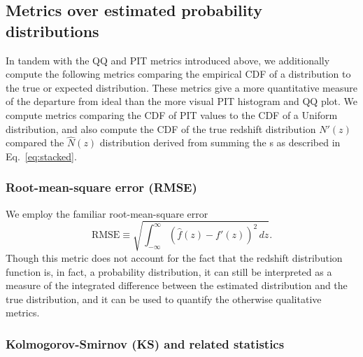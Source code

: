 
\subsection{Metrics over estimated probability distributions}
\label{sec:quantmet}

In tandem with the QQ and PIT metrics introduced above, we additionally compute the following metrics comparing the empirical CDF of a distribution to the true or expected distribution.
These metrics give a more quantitative measure of the departure from ideal than the more visual PIT histogram and QQ plot.
We compute metrics comparing the CDF of PIT values to the CDF of a Uniform distribution, and also compute the CDF of the true redshift distribution $N'(z)$ compared the $\hat{N}(z)$ distribution derived from summing the \pzpdf s as described in Eq.~\ref{eq:stacked}.

\subsubsection{Root-mean-square error (RMSE)}
\label{sec:rmse}

We employ the familiar root-mean-square error
\begin{equation}
\mathrm{RMSE} \equiv \sqrt{\int_{-\infty}^{\infty}\left(\hat{f}(z)-f'(z)\right)^{2}\,dz} .
\end{equation}
Though this metric does not account for the fact that the redshift distribution function is, in fact, a probability distribution, it can still be interpreted as a measure of the integrated difference between the estimated distribution and the true distribution, and it can be used to quantify the otherwise qualitative metrics.


\subsubsection{Kolmogorov-Smirnov (KS) and related statistics}
\label{sec:ks}

